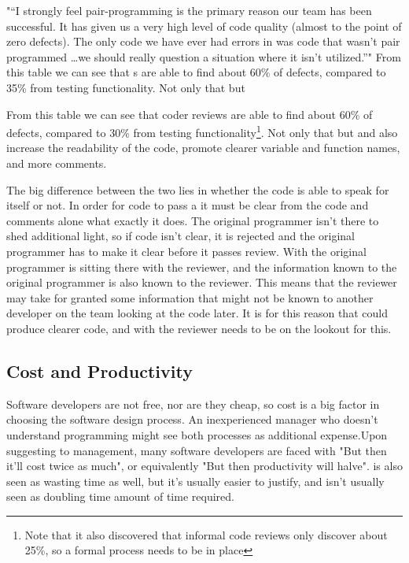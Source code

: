 \documentclass{article}
\begin{document}
\PP "“I strongly feel pair-programming is the primary reason our team has been successful. It has given us a very high level of code quality (almost to the point of zero defects). The only code we have ever had errors in was code that wasn't pair programmed \dots we should really question a situation where it isn't utilized.”"
From this table we can see that \CR s are able to find about 60\% of defects, compared to 35\% from testing functionality. Not only that but \CR

From this table we can see that coder reviews are able to find about 60\% of defects, compared to 30\% from testing functionality\footnote{Note that it also discovered that informal code reviews only discover about 25\%, so a formal process needs to be in place}. Not only that but \CR and \PP also increase the readability of the code, promote clearer variable and function names, and more comments.

The big difference between the two lies in whether the code is able to speak for itself or not. In order for code to pass a \CR it must be clear from the code and comments alone what exactly it does. The original programmer isn't there to shed additional light, so if code isn't clear, it is rejected and the original programmer has to make it clear before it passes review. With \PP the original programmer is sitting there with the reviewer, and the information known to the original programmer is also known to the reviewer. This means that the reviewer may take for granted some information that might not be known to another developer on the team looking at the code later. It is for this reason that \CR could produce clearer code, and with \PP the reviewer needs to be on the lookout for this.


\subsection{Cost and Productivity}

Software developers are not free, nor are they cheap, so cost is a big factor in choosing the software design process. An inexperienced manager who doesn't understand programming might see both processes as additional expense.Upon suggesting \PP to management, many software developers are faced with "But then it'll cost twice as much", or equivalently "But then productivity will halve". \CR is also seen as wasting time as well, but it's usually easier to justify, and isn't usually seen as doubling time amount of time required.
\end{document}
